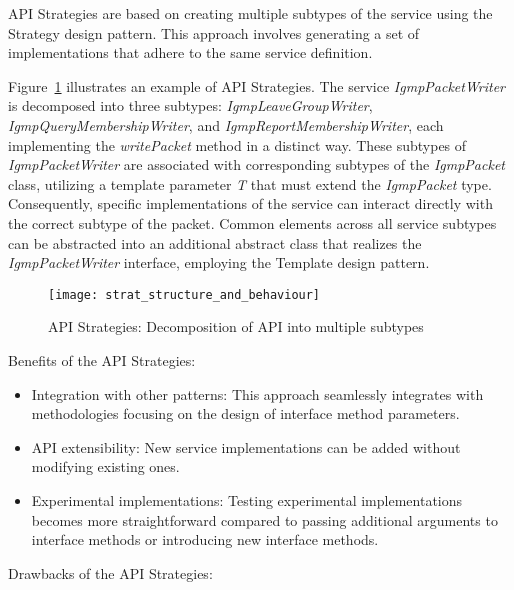 API Strategies are based on creating multiple subtypes of the service using the Strategy design pattern.
This approach involves generating a set of implementations that adhere to the same service definition.

Figure~\ref{fig:strat_structure_and_behaviour} illustrates an example of API Strategies.
The service \textit{IgmpPacketWriter} is decomposed into three subtypes: \textit{IgmpLeaveGroupWriter},
\textit{IgmpQueryMembershipWriter}, and \textit{IgmpReportMembershipWriter},
each implementing the \textit{writePacket} method in a distinct way.
These subtypes of \textit{IgmpPacketWriter} are associated with corresponding subtypes of the \textit{IgmpPacket} class,
utilizing a template parameter \textit{T} that must extend the \textit{IgmpPacket} type.
Consequently, specific implementations of the service can interact directly with the correct subtype of the packet.
Common elements across all service subtypes can be abstracted into an additional abstract class that realizes
the \textit{IgmpPacketWriter} interface, employing the Template design pattern.

\begin{figure}[!htb]
    \centering
    \texttt{[image: strat\_structure\_and\_behaviour]}
    \caption{API Strategies: Decomposition of API into multiple subtypes}
    \label{fig:strat_structure_and_behaviour}
\end{figure}

Benefits of the API Strategies:

\begin{itemize}
    \item Integration with other patterns:
    This approach seamlessly integrates with methodologies focusing on the design of interface method parameters.
    \item API extensibility:
    New service implementations can be added without modifying existing ones.
    \item Experimental implementations:
    Testing experimental implementations becomes more straightforward compared to passing additional arguments
    to interface methods or introducing new interface methods.
\end{itemize}

Drawbacks of the API Strategies:

